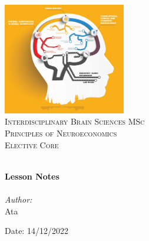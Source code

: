 
\begin{titlepage}
\vbox{ }
\vbox{ }
\begin{center}
\includegraphics[width=0.40\textwidth]{Images/IDB Logo.jpg}\\[1cm]
\textsc{\LARGE Interdisciplinary Brain Sciences MSc}\\[1.5cm]
\textsc{\Large Principles of Neuroeconomics}\\[1cm]
\textsc{\Large Elective Core}\\[0.5cm]
\vbox{ }

\HRule \\[0.4cm]
{ \huge \bfseries Lesson Notes}\\[0.4cm]
\HRule \\[1.5cm]

\large
\emph{Author:}\\
Ata
\vfill

{\large Date: 14/12/2022}
\end{center}
\end{titlepage}